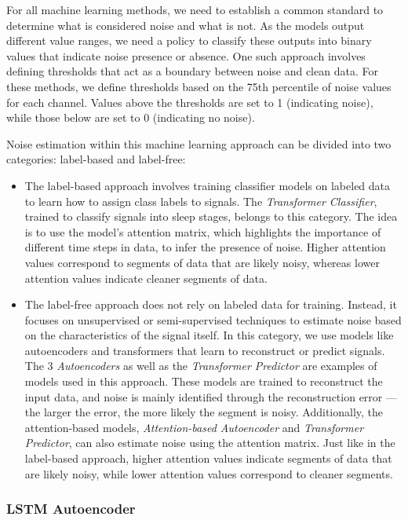 For all machine learning methods, we need to establish a common standard to determine what is considered noise and what is not. As the models output different value ranges, we need a policy to classify these outputs into binary values that indicate noise presence or absence. One such approach involves defining thresholds that act as a boundary between noise and clean data. For these methods, we define thresholds based on the 75th percentile of noise values for each channel. Values above the thresholds are set to 1 (indicating noise), while those below are set to 0 (indicating no noise).

Noise estimation within this machine learning approach can be divided into two categories: label-based and label-free:

\begin{itemize}
    \item The label-based approach involves training classifier models on labeled data to learn how to assign class labels to signals. The \emph{Transformer Classifier}, trained to classify signals into sleep stages, belongs to this category. The idea is to use the model’s attention matrix, which highlights the importance of different time steps in data, to infer the presence of noise. Higher attention values correspond to segments of data that are likely noisy, whereas lower attention values indicate cleaner segments of data.
    \vspace{-0.2cm}
    \item The label-free approach does not rely on labeled data for training. Instead, it focuses on unsupervised or semi-supervised techniques to estimate noise based on the characteristics of the signal itself. In this category, we use models like autoencoders and transformers that learn to reconstruct or predict signals. The 3 \emph{Autoencoders} as well as the \emph{Transformer Predictor} are examples of models used in this approach. These models are trained to reconstruct the input data, and noise is mainly identified through the reconstruction error — the larger the error, the more likely the segment is noisy. Additionally, the attention-based models, \emph{Attention-based Autoencoder} and \emph{Transformer Predictor}, can also estimate noise using the attention matrix. Just like in the label-based approach, higher attention values indicate segments of data that are likely noisy, while lower attention values correspond to cleaner segments.
\end{itemize}

\subsubsection{LSTM Autoencoder}

